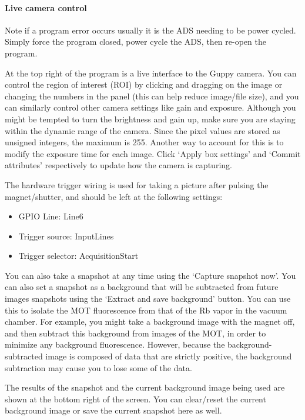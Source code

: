 \documentclass{../lab}
\begin{document}
\paragraph{Live camera control}

Note if a program error occurs usually it is the ADS needing to be power cycled. Simply force the program closed, power cycle the ADS, then re-open the program.

At the top right of the program is a live interface to the Guppy camera. You can control the region of interest (ROI) by clicking and dragging on the image or changing the numbers in the panel (this can help reduce image/file size), and you can similarly control other camera settings like gain and exposure. Although you might be tempted to turn the brightness and gain up, make sure you are staying within the dynamic range of the camera. Since the pixel values are stored as unsigned integers, the maximum is 255. Another way to account for this is to modify the exposure time for each image. Click `Apply box settings' and `Commit attributes' respectively to update how the camera is capturing. 

The hardware trigger wiring is used for taking a picture after pulsing the magnet/shutter, and should be left at the following settings:

\begin{itemize}
    \item GPIO Line: Line6
    \item Trigger source: InputLines
    \item Trigger selector: AcquisitionStart
\end{itemize}

You can also take a snapshot at any time using the `Capture snapshot now'. You can also set a snapshot as a background that will be subtracted from future images snapshots using the `Extract and save background' button. You can use this to isolate the MOT fluorescence from that of the Rb vapor in the vacuum chamber. For example, you might take a background image with the magnet off, and then subtract this background from images of the MOT, in order to minimize any background fluorescence. However, because the background-subtracted image is composed of data that are strictly positive, the background subtraction may cause you to lose some of the data.

The results of the snapshot and the current background image being used are shown at the bottom right of the screen. You can clear/reset the current background image or save the current snapshot here as well.
\end{document}
